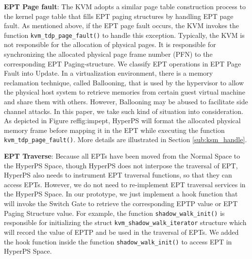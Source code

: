 \textbf{EPT Page fault}:
The KVM adopts a similar page table construction process to the kernel page table that fills EPT paging structures by handling EPT page fault. 
As mentioned above, if the EPT page fault occurs, the KVM invokes the function \verb|kvm_tdp_page_fault()| to handle this exception. 
Typically, the KVM is not responsible for the allocation of physical pages. 
It is responsible for synchronizing the allocated physical page frame number (PFN) to the corresponding EPT Paging-structure. We classify EPT operations in EPT Page Fault into Update. 
In a virtualization environment, there is a memory reclamation technique, called Ballooning, that is used by the hypervisor to allow the physical host system to retrieve memories from certain guest virtual machine and share them with others. 
However, Ballooning may be abused to facilitate side channel attacks. 
In this paper, we take such kind of situation into consideration. As depicted in Figure ref{fig:impept}, 
HyperPS will format the allocated physical memory frame before mapping it in the EPT while executing the function \verb|kvm_tdp_page_fault()|. More details are illustrated in Section \ref{sub:ksm_handle}. 

\textbf{EPT Traverse}: 
Because all EPTs have been moved from the Normal Space to the HyperPS Space, though HyperPS does not interpose the traversal of EPT, HyperPS also needs to instrument EPT traversal functions, so that they can access EPTs. 
However, we do not need to re-implement EPT traversal services in the HyperPS Space. In our prototype, we just implement a hook function that will invoke the Switch Gate to retrieve the corresponding EPTP value or EPT Paging Structure value. 
For example, the function \verb|shadow_walk_init()| is responsible for initializing the struct \verb|kvm_shadow_walk_iterator| structure which will record the value of EPTP and be used in the traversal of EPTs. We added the hook function inside the function \verb|shadow_walk_init()| to access EPT in HyperPS Space. 

